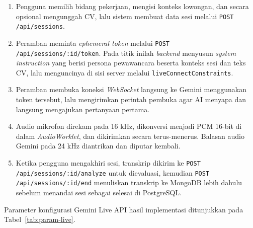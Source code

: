 \documentclass[12pt,a4paper,oneside]{report}
\begin{document}
\begin{enumerate}[leftmargin=*,itemsep=2pt]
  \item Pengguna memilih bidang pekerjaan, mengisi konteks lowongan, dan
        secara opsional mengunggah CV, lalu sistem membuat data sesi melalui
        \texttt{POST /api/sessions}.
  \item Peramban meminta \textit{ephemeral token} melalui
        \texttt{POST /api/sessions/:id/token}. Pada titik inilah
        \textit{backend} menyusun \textit{system instruction} yang berisi
        persona pewawancara beserta konteks sesi dan teks CV, lalu menguncinya
        di sisi server melalui \texttt{liveConnectConstraints}.
  \item Peramban membuka koneksi \textit{WebSocket} langsung ke Gemini
        menggunakan token tersebut, lalu mengirimkan perintah pembuka agar AI
        menyapa dan langsung mengajukan pertanyaan pertama.
  \item Audio mikrofon direkam pada 16 kHz, dikonversi menjadi PCM 16-bit di
        dalam \textit{AudioWorklet}, dan dikirimkan secara terus-menerus.
        Balasan audio Gemini pada 24 kHz diantrikan dan diputar kembali.
  \item Ketika pengguna mengakhiri sesi, transkrip dikirim ke
        \texttt{POST /api/sessions/}\linebreak[1]\texttt{:id/analyze} untuk dievaluasi, kemudian
        \texttt{POST /api/sessions/:id/end} menuliskan transkrip ke MongoDB
        lebih dahulu sebelum menandai sesi sebagai selesai di PostgreSQL.
\end{enumerate}

Parameter konfigurasi Gemini Live API hasil implementasi ditunjukkan pada
Tabel~\ref{tab:param-live}.
\end{document}
